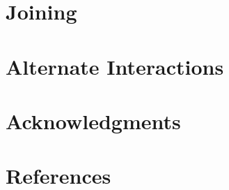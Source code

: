 \documentclass{sig-alternate}
\begin{document}
\section{Joining}
\label{sec:Joining}

\section{Alternate Interactions}
\label{sec:Alternate Interactions}

\section{Acknowledgments}
\label{sec:Acknowledgments}

\section{References}
\label{sec:References}
\end{document}
